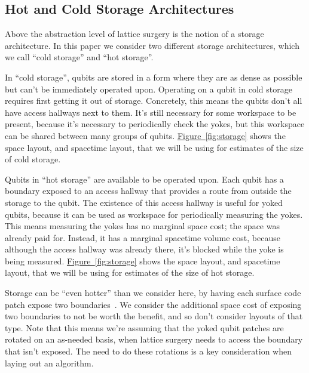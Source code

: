 \documentclass[onecolumn,unpublished,a4paper]{quantumarticle}
\theoremstyle{definition}
\theoremstyle{definition}
\theoremstyle{definition}
\newcommand{\fig}[1]{\hyperref[fig:#1]{Figure~\ref*{fig:#1}}}
\begin{document}
\subsection{Hot and Cold Storage Architectures}

Above the abstraction level of lattice surgery is the notion of a storage architecture.
In this paper we consider two different storage architectures, which we call ``cold storage'' and ``hot storage''.

In ``cold storage'', qubits are stored in a form where they are as dense as possible but can't be immediately operated upon.
Operating on a qubit in cold storage requires first getting it out of storage.
Concretely, this means the qubits don't all have access hallways next to them.
It's still necessary for some workspace to be present, because it's necessary to periodically check the yokes, but this workspace can be shared between many groups of qubits.
\fig{storage} shows the space layout, and spacetime layout, that we will be using for estimates of the size of cold storage.

Qubits in ``hot storage'' are available to be operated upon.
Each qubit has a boundary exposed to an access hallway that provides a route from outside the storage to the qubit.
The existence of this access hallway is useful for yoked qubits, because it can be used as workspace for periodically measuring the yokes.
This means measuring the yokes has no marginal space cost; the space was already paid for.
Instead, it has a marginal spacetime volume cost, because although the access hallway was already there, it's blocked while the yoke is being measured.
\fig{storage} shows the space layout, and spacetime layout, that we will be using for estimates of the size of hot storage.

Storage can be ``even hotter'' than we consider here, by having each surface code patch expose two boundaries~\cite{litinski2019gameofsurfacecodes,litinskyhypercubeshor2023}.
We consider the additional space cost of exposing two boundaries to not be worth the benefit, and so don't consider layouts of that type.
Note that this means we're assuming that the yoked qubit patches are rotated on an as-needed basis, when lattice surgery needs to access the boundary that isn't exposed.
The need to do these rotations is a key consideration when laying out an algorithm.
\end{document}

